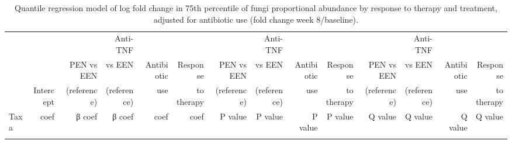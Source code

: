 \newpage
{\scriptsize
	\begin{landscape}
		\renewcommand{\arraystretch}{0.7} \setlength{\tabcolsep}{3pt}
		\begin{longtable}{ | l | r | r | r | r | r | r  | r | r | r | r | r | r  | r  |}
			\caption[Quantile regression model of log fold change in 75th percentile of fungi proportional abundance by response to therapy and treatment, adjusted for antibiotic use (fold change week 8/baseline).]{Quantile regression model of log fold change in 75th percentile of fungi proportional abundance by response to therapy and treatment, adjusted for antibiotic use (fold change week 8/baseline).} 
			\label{TS14} \\
			
			&  &	 &	Anti-TNF   & &	 &	  &	Anti-TNF & && 	& Anti-TNF  & 	&   \\
			
			&  &	PEN vs EEN &	vs EEN  &	Antibiotic &	Response &	 PEN vs EEN  &	vs EEN &	Antibiotic&	Response& PEN vs EEN	& vs EEN & 	Antibiotic	& Response  \\
			
			& Intercept & (reference) &	(reference) &	use & to therapy &(reference) &(reference) &	use &to therapy	&(reference)	& (reference)& use	& to therapy  \\
			\hline 
			Taxa & coef & β coef & β coef & coef & coef & P value & P value & P value & P value & Q value & Q value & Q value & Q value \\ 
			\hline 
			\endfirsthead
			
			
			\endfoot
			
			\hline 
			\endlastfoot
			

\end{longtable}
\end{landscape}}
